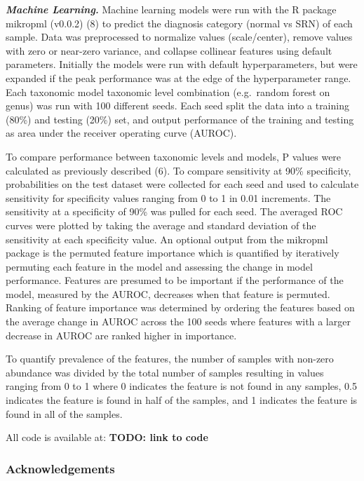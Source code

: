 \documentclass[]{article}
\begin{document}
\textbf{\emph{Machine Learning.}} Machine learning models were run with
the R package mikropml (v0.0.2) (8) to predict the diagnosis category
(normal vs SRN) of each sample. Data was preprocessed to normalize
values (scale/center), remove values with zero or near-zero variance,
and collapse collinear features using default parameters. Initially the
models were run with default hyperparameters, but were expanded if the
peak performance was at the edge of the hyperparameter range. Each
taxonomic model taxonomic level combination (e.g.~random forest on
genus) was run with 100 different seeds. Each seed split the data into a
training (80\%) and testing (20\%) set, and output performance of the
training and testing as area under the receiver operating curve (AUROC).

To compare performance between taxonomic levels and models, P values
were calculated as previously described (6). To compare sensitivity at
90\% specificity, probabilities on the test dataset were collected for
each seed and used to calculate sensitivity for specificity values
ranging from 0 to 1 in 0.01 increments. The sensitivity at a specificity
of 90\% was pulled for each seed. The averaged ROC curves were plotted
by taking the average and standard deviation of the sensitivity at each
specificity value. An optional output from the mikropml package is the
permuted feature importance which is quantified by iteratively permuting
each feature in the model and assessing the change in model performance.
Features are presumed to be important if the performance of the model,
measured by the AUROC, decreases when that feature is permuted. Ranking
of feature importance was determined by ordering the features based on
the average change in AUROC across the 100 seeds where features with a
larger decrease in AUROC are ranked higher in importance.

To quantify prevalence of the features, the number of samples with
non-zero abundance was divided by the total number of samples resulting
in values ranging from 0 to 1 where 0 indicates the feature is not found
in any samples, 0.5 indicates the feature is found in half of the
samples, and 1 indicates the feature is found in all of the samples.

All code is available at: \textbf{TODO: link to code}

\subsubsection{Acknowledgements}\label{acknowledgements}
\end{document}

